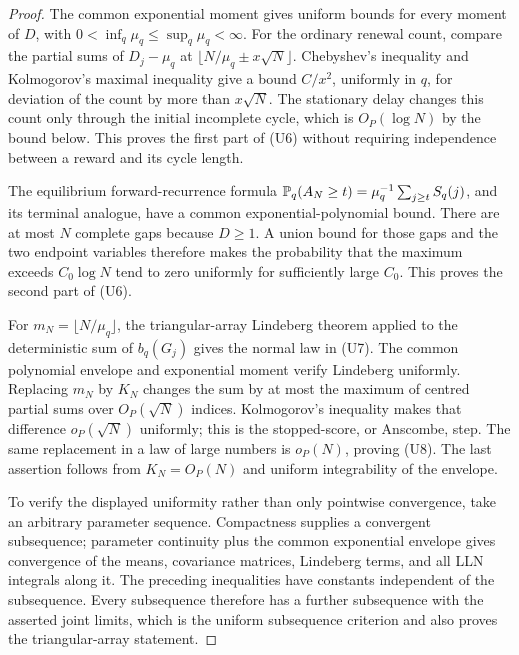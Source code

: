 \begin{proof}
The common exponential moment gives uniform bounds for every moment of
\(D\), with \(0<\inf_q\mu_q\le\sup_q\mu_q<\infty\).  For the ordinary
renewal count, compare the partial sums of \(D_j-\mu_q\) at
\(\lfloor N/\mu_q\pm x\sqrt N\rfloor\).  Chebyshev's inequality and
Kolmogorov's maximal inequality give a bound \(C/x^2\), uniformly in \(q\),
for deviation of the count by more than \(x\sqrt N\).  The stationary delay
changes this count only through the initial incomplete cycle, which is
\(O_P(\log N)\) by the bound below.  This proves the first part of
\textup{(U6)} without requiring independence between a reward and its cycle
length.

The equilibrium forward-recurrence formula
\(\mathbb{P}_q(A_N\ge t)=\mu_q^{-1}\sum_{j\ge t}S_q(j)\), and its terminal analogue,
have a common exponential-polynomial bound.  There are at most \(N\) complete
gaps because \(D\ge1\).  A union bound for those gaps and the two endpoint
variables therefore makes the probability that the maximum exceeds
\(C_0\log N\) tend to zero uniformly for sufficiently large \(C_0\).  This
proves the second part of \textup{(U6)}.

For \(m_N=\lfloor N/\mu_q\rfloor\), the triangular-array Lindeberg theorem
applied to the deterministic sum of \(b_q(G_j)\) gives the normal law in
\textup{(U7)}.  The common polynomial envelope and exponential moment verify
Lindeberg uniformly.  Replacing \(m_N\) by \(K_N\) changes the sum by at most
the maximum of centred partial sums over \(O_P(\sqrt N)\) indices.
Kolmogorov's inequality makes that difference \(o_P(\sqrt N)\) uniformly;
this is the stopped-score, or Anscombe, step.  The same replacement in a
law of large numbers is \(o_P(N)\), proving \textup{(U8)}.  The last assertion
follows from \(K_N=O_P(N)\) and uniform integrability of the envelope.

To verify the displayed uniformity rather than only pointwise convergence,
take an arbitrary parameter sequence.  Compactness supplies a convergent
subsequence; parameter continuity plus the common exponential envelope gives
convergence of the means, covariance matrices, Lindeberg terms, and all LLN
integrals along it.  The preceding inequalities have constants independent of
the subsequence.  Every subsequence therefore has a further subsequence with
the asserted joint limits, which is the uniform subsequence criterion and
also proves the triangular-array statement.
\end{proof}


